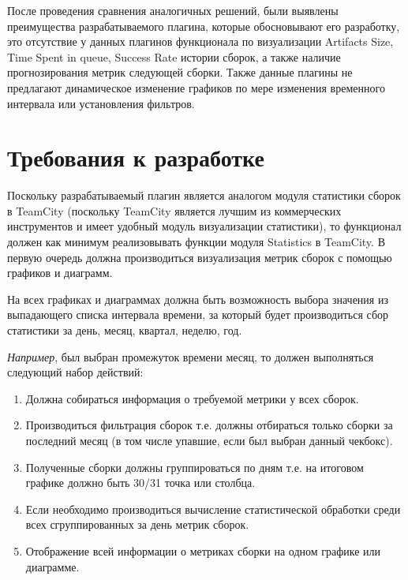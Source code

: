   После проведения сравнения аналогичных решений, были выявлены преимущества разрабатываемого плагина, которые обосновывают его разработку, это отсутствие у данных плагинов функционала по визуализации Artifacts Size, Time Spent in queue, Success Rate истории сборок, а также наличие прогнозирования метрик следующей сборки. Также данные плагины не предлагают динамическое изменение графиков по мере изменения временного интервала или установления фильтров.



\section{Требования к разработке} \label{ch1:sec6}

Поскольку разрабатываемый плагин является аналогом модуля статистики сборок в TeamCity (поскольку TeamCity является лучшим из коммерческих инструментов и имеет удобный модуль визуализации статистики), то функционал должен как минимум реализовывать функции модуля Statistics в TeamCity. В первую очередь должна производиться визуализация метрик сборок с помощью графиков и диаграмм.

На всех графиках и диаграммах должна быть возможность выбора значения из выпадающего списка интервала времени, за который будет производиться сбор статистики за день, месяц, квартал, неделю, год.

\textit{Например}, был выбран промежуток времени месяц, то должен выполняться следующий набор действий:

\begin{enumerate}
	\item Должна собираться информация о требуемой метрики у всех сборок.
	
	\item Производиться фильтрация сборок т.е. должны отбираться только сборки за последний месяц (в том числе упавшие, если был выбран данный чекбокс).
	
	\item Полученные сборки должны группироваться по дням т.е. на итоговом графике должно быть 30/31 точка или столбца.
	
	\item Если необходимо производиться вычисление статистической обработки среди всех сгруппированных за день метрик сборок.
	
	\item Отображение всей информации о метриках сборки на одном графике или диаграмме.
	
	
\end{enumerate}


